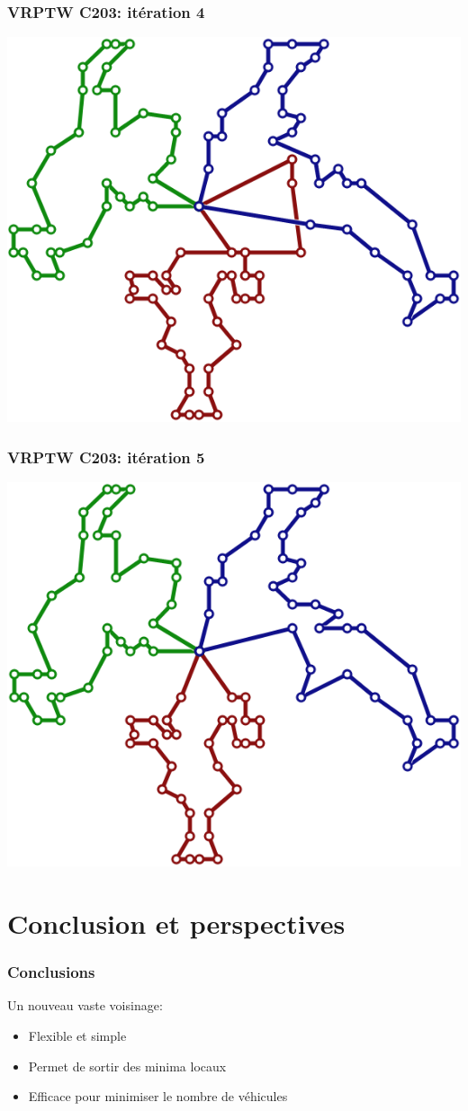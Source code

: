 \documentclass[table]{beamer}
\begin{document}
\begin{frame}
  \frametitle{VRPTW C203: itération 4}

  \centering
  \includegraphics[width=0.7\linewidth]{../article/images/C203-4}
\end{frame}

\begin{frame}
  \frametitle{VRPTW C203: itération 5}

  \centering
  \includegraphics[width=0.7\linewidth]{../article/images/C203-5}
\end{frame}

\section{Conclusion et perspectives}

\begin{frame}
  \frametitle{Conclusions}

  Un nouveau vaste voisinage:
  \begin{itemize}
  \item Flexible et simple
  \item Permet de sortir des minima locaux
  \item Efficace pour minimiser le nombre de véhicules
  \end{itemize}
\end{frame}
\end{document}
